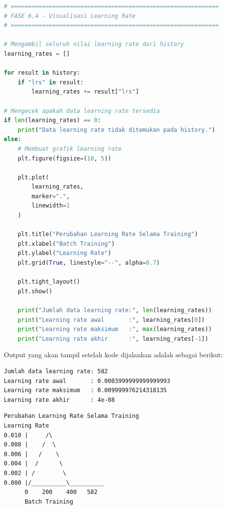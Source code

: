 \begin{lstlisting}[language=Python, caption=Visualisasi learning rate]
# ============================================================
# FASE 6.4 - Visualisasi Learning Rate
# ============================================================

# Mengambil seluruh nilai learning rate dari history
learning_rates = []

for result in history:
    if "lrs" in result:
        learning_rates += result["lrs"]

# Mengecek apakah data learning rate tersedia
if len(learning_rates) == 0:
    print("Data learning rate tidak ditemukan pada history.")
else:
    # Membuat grafik learning rate
    plt.figure(figsize=(10, 5))

    plt.plot(
        learning_rates,
        marker=".",
        linewidth=1
    )

    plt.title("Perubahan Learning Rate Selama Training")
    plt.xlabel("Batch Training")
    plt.ylabel("Learning Rate")
    plt.grid(True, linestyle="--", alpha=0.7)

    plt.tight_layout()
    plt.show()

    print("Jumlah data learning rate:", len(learning_rates))
    print("Learning rate awal       :", learning_rates[0])
    print("Learning rate maksimum   :", max(learning_rates))
    print("Learning rate akhir      :", learning_rates[-1])
\end{lstlisting}

Output yang akan tampil setelah kode dijalankan adalah sebagai berikut:

\begin{outputcode}[H]
\begin{lstlisting}[language={}]
Jumlah data learning rate: 582
Learning rate awal       : 0.0003999999999999993
Learning rate maksimum   : 0.009999976214318135
Learning rate akhir      : 4e-08
\end{lstlisting}
\caption{Output data learning rate}
\end{outputcode}


\begin{outputcode}[H]
\begin{lstlisting}[language={}]
Perubahan Learning Rate Selama Training
Learning Rate
0.010 |     /\
0.008 |    /  \
0.006 |   /    \
0.004 |  /      \
0.002 | /        \
0.000 |/__________\__________
      0    200    400   582
      Batch Training
\end{lstlisting}
\caption{Ilustrasi grafik perubahan learning rate}
\end{outputcode}


